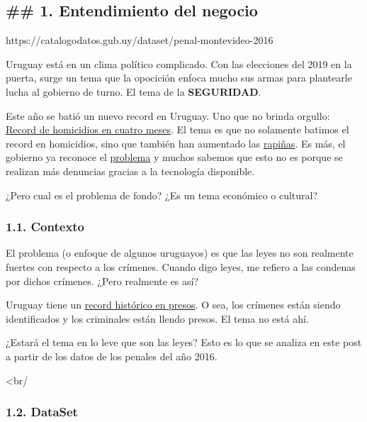 \documentclass[11pt]{article}
\begin{document}
    \subsection{\#\# 1. Entendimiento del negocio
}\label{entendimiento-del-negocio}

https://catalogodatos.gub.uy/dataset/penal-montevideo-2016

Uruguay está en un clima político complicado. Con las elecciones del
2019 en la puerta, surge un tema que la opocición enfoca mucho sus armas
para plantearle lucha al gobierno de turno. El tema de la
\textbf{SEGURIDAD}.

Este año se batió un nuevo record en Uruguay. Uno que no brinda orgullo:
\href{https://www.elpais.com.uy/informacion/policiales/record-homicidios-muertes-cuatro-meses.html}{Record
de homicidios en cuatro meses}. El tema es que no solamente batimos el
record en homicidios, sino que también han aumentado las
\href{https://www.elobservador.com.uy/nota/homicidios-aumentaron-66-4-y-rapinas-un-55-8-en-el-primer-semestre-de-2018-20188218280}{rapiñas}.
Es más, el gobierno ya reconoce el
\href{https://www.elobservador.com.uy/nota/se-revelo-la-cifra-que-tanto-preocupa-a-bonomi-4-800-rapinas-mas-en-lo-que-va-de-2018-20186291360}{problema}
y muchos sabemos que esto no es porque se realizan más denuncias gracias
a la tecnología disponible.

¿Pero cual es el problema de fondo? ¿Es un tema económico o cultural?

    \subsubsection{1.1. Contexto }\label{contexto}

El problema (o enfoque de algunos uruguayos) es que las leyes no son
realmente fuertes con respecto a los crímenes. Cuando digo leyes, me
refiero a las condenas por dichos crímenes. ¿Pero realmente es así?

Uruguay tiene un
\href{https://www.elpais.com.uy/informacion/uruguay-record-historico-presos.html}{record
histórico en presos}. O sea, los crímenes están siendo identificados y
los criminales están llendo presos. El tema no está ahí.

¿Estará el tema en lo leve que son las leyes? Esto es lo que se analiza
en este post a partir de los datos de los penales del año 2016.

\textless{}br/

    \subsubsection{1.2. DataSet }\label{dataset}
\end{document}
